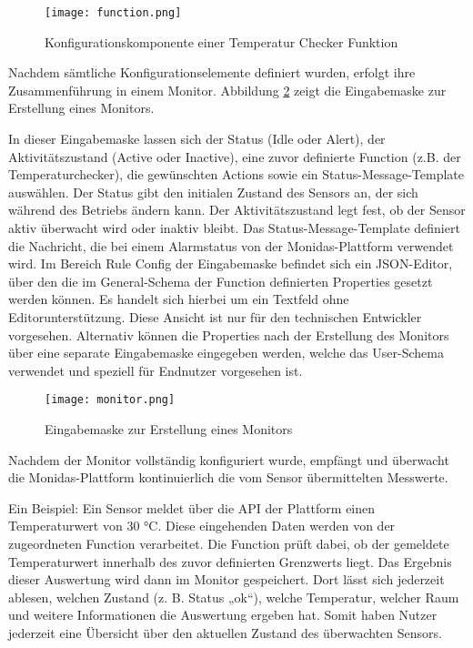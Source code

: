 \begin{figure}[H]
  \centering
  \texttt{[image: function.png]}
  \caption{Konfigurationskomponente einer Temperatur Checker Funktion}
  \label{fig:function}
\end{figure}

Nachdem sämtliche Konfigurationselemente definiert wurden, erfolgt ihre Zusammenführung in einem Monitor. Abbildung \ref{fig:monitor} zeigt die Eingabemaske zur Erstellung eines Monitors.

In dieser Eingabemaske lassen sich der Status (Idle oder Alert), der Aktivitätszustand (Active oder Inactive), eine zuvor definierte Function (z.B. der Temperaturchecker), die gewünschten Actions sowie ein Status-Message-Template auswählen. Der Status gibt den initialen Zustand des Sensors an, der sich während des Betriebs ändern kann. Der Aktivitätszustand legt fest, ob der Sensor aktiv überwacht wird oder inaktiv bleibt. Das Status-Message-Template definiert die Nachricht, die bei einem Alarmstatus von der Monidas-Plattform verwendet wird. Im Bereich Rule Config der Eingabemaske befindet sich ein JSON-Editor, über den die im General-Schema der Function definierten Properties gesetzt werden können. Es handelt sich hierbei um ein Textfeld ohne Editorunterstützung. Diese Ansicht ist nur für den technischen Entwickler vorgesehen. Alternativ können die Properties nach der Erstellung des Monitors über eine separate Eingabemaske eingegeben werden, welche das User-Schema verwendet und speziell für Endnutzer vorgesehen ist.

\begin{figure}[H]
  \centering
  \texttt{[image: monitor.png]}
  \caption{Eingabemaske zur Erstellung eines Monitors}
  \label{fig:monitor}
\end{figure}

\iffalse
\begin{figure}[H]
  \centering
  \texttt{[image: monitor1.png]}
  \caption{Benutzerfreundliche Eingabemaske für Endnutzer}
  \label{fig:monitor1}
\end{figure}
\fi


Nachdem der Monitor vollständig konfiguriert wurde, empfängt und überwacht die Monidas-Plattform kontinuierlich die vom Sensor übermittelten Messwerte. 

Ein Beispiel: Ein Sensor meldet über die API der Plattform einen Temperaturwert von 30 °C. Diese eingehenden Daten werden von der zugeordneten Function verarbeitet. Die Function prüft dabei, ob der gemeldete Temperaturwert innerhalb des zuvor definierten Grenzwerts liegt. Das Ergebnis dieser Auswertung wird dann im Monitor gespeichert. Dort lässt sich jederzeit ablesen, welchen Zustand (z. B. Status „ok“), welche Temperatur, welcher Raum und weitere Informationen die Auswertung ergeben hat. Somit haben Nutzer jederzeit eine Übersicht über den aktuellen Zustand des überwachten Sensors.

